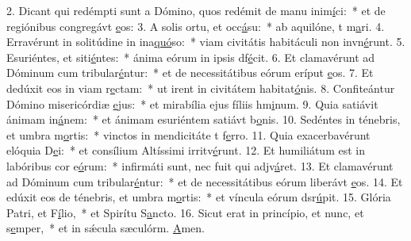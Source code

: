 2. Dicant qui redémpti sunt a Dómino, quos redémit de manu inim\uline{í}ci:~* et de regiónibus congregávt \uline{e}os:
3. A solis ortu, et occ\uline{á}su:~* ab aquilóne, t m\uline{a}ri.
4. Erravérunt in solitúdine in ina\uline{quó}so:~* viam civitátis habitáculi non invn\uline{é}runt.
5. Esuriéntes, et siti\uline{é}ntes:~* ánima eórum in ipsis df\uline{é}cit.
6. Et clamavérunt ad Dóminum cum tribular\uline{é}ntur:~* et de necessitátibus eórum eríput \uline{e}os.
7. Et dedúxit eos in viam r\uline{e}ctam:~* ut irent in civitátem habitat\uline{ó}nis.
8. Confiteántur Dómino misericórdiæ \uline{e}jus:~* et mirabília ejus fíliis hm\uline{i}num.
9. Quia satiávit ánimam in\uline{á}nem:~* et ánimam esuriéntem satiávt b\uline{o}nis.
10. Sedéntes in ténebris, et umbra m\uline{o}rtis:~* vinctos in mendicitáte t f\uline{e}rro.
11. Quia exacerbavérunt elóquia D\uline{e}i:~* et consílium Altíssimi irritv\uline{é}runt.
12. Et humiliátum est in labóribus cor e\uline{ó}rum:~* infirmáti sunt, nec fuit qui adjv\uline{á}ret.
13. Et clamavérunt ad Dóminum cum tribular\uline{é}ntur:~* et de necessitátibus eórum liberávt \uline{e}os.
14. Et edúxit eos de ténebris, et umbra m\uline{o}rtis:~* et víncula eórum dsr\uline{ú}pit.
15. Glória Patri, et F\uline{í}lio,~* et Spirítu S\uline{a}ncto.
16. Sicut erat in princípio, et nunc, et s\uline{e}mper,~* et in sǽcula sæculórm. \uline{A}men.
